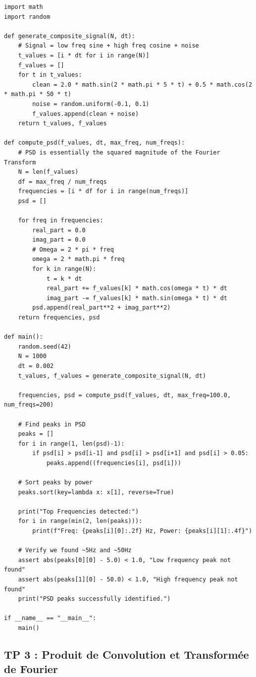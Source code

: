 \documentclass[11pt,a4paper]{article}
\begin{document}
\begin{lstlisting}
import math
import random

def generate_composite_signal(N, dt):
    # Signal = low freq sine + high freq cosine + noise
    t_values = [i * dt for i in range(N)]
    f_values = []
    for t in t_values:
        clean = 2.0 * math.sin(2 * math.pi * 5 * t) + 0.5 * math.cos(2 * math.pi * 50 * t)
        noise = random.uniform(-0.1, 0.1)
        f_values.append(clean + noise)
    return t_values, f_values

def compute_psd(f_values, dt, max_freq, num_freqs):
    # PSD is essentially the squared magnitude of the Fourier Transform
    N = len(f_values)
    df = max_freq / num_freqs
    frequencies = [i * df for i in range(num_freqs)]
    psd = []

    for freq in frequencies:
        real_part = 0.0
        imag_part = 0.0
        # Omega = 2 * pi * freq
        omega = 2 * math.pi * freq
        for k in range(N):
            t = k * dt
            real_part += f_values[k] * math.cos(omega * t) * dt
            imag_part -= f_values[k] * math.sin(omega * t) * dt
        psd.append(real_part**2 + imag_part**2)
    return frequencies, psd

def main():
    random.seed(42)
    N = 1000
    dt = 0.002
    t_values, f_values = generate_composite_signal(N, dt)

    frequencies, psd = compute_psd(f_values, dt, max_freq=100.0, num_freqs=200)

    # Find peaks in PSD
    peaks = []
    for i in range(1, len(psd)-1):
        if psd[i] > psd[i-1] and psd[i] > psd[i+1] and psd[i] > 0.05:
            peaks.append((frequencies[i], psd[i]))

    # Sort peaks by power
    peaks.sort(key=lambda x: x[1], reverse=True)

    print("Top Frequencies detected:")
    for i in range(min(2, len(peaks))):
        print(f"Freq: {peaks[i][0]:.2f} Hz, Power: {peaks[i][1]:.4f}")

    # Verify we found ~5Hz and ~50Hz
    assert abs(peaks[0][0] - 5.0) < 1.0, "Low frequency peak not found"
    assert abs(peaks[1][0] - 50.0) < 1.0, "High frequency peak not found"
    print("PSD peaks successfully identified.")

if __name__ == "__main__":
    main()
\end{lstlisting}


\subsection*{TP 3 : Produit de Convolution et Transformée de Fourier}
\end{document}
